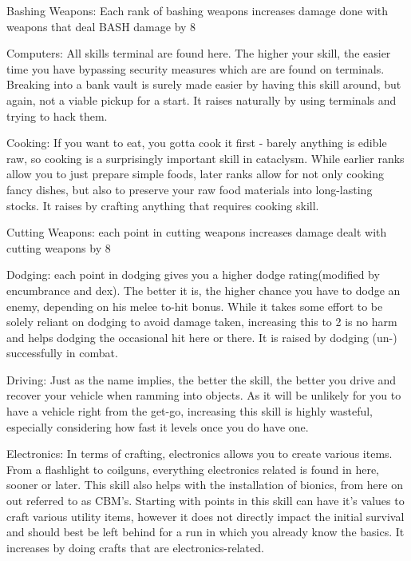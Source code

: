 \documentclass[11pt]{report}
\begin{document}
Bashing Weapons: Each rank of bashing weapons increases damage done with weapons that deal BASH damage by 8%

Computers: All skills terminal are found here. The higher your skill, the easier time you have bypassing security measures which are are found on terminals. Breaking into a bank vault is surely made easier by having this skill around, but again, not a viable pickup for a start. It raises naturally by using terminals and trying to hack them.

Cooking: If you want to eat, you gotta cook it first - barely anything is edible raw, so cooking is a surprisingly important skill in cataclysm. While earlier ranks allow you to just prepare simple foods, later ranks allow for not only cooking fancy dishes, but also to preserve your raw food materials into long-lasting stocks. It raises by crafting anything that requires cooking skill.

Cutting Weapons: each point in cutting weapons increases damage dealt with cutting weapons by 8%

Dodging: each point in dodging gives you a higher dodge rating(modified by encumbrance and dex). The better it is, the higher chance you have to dodge an enemy, depending on his melee to-hit bonus. While it takes some effort to be solely reliant on dodging to avoid damage taken, increasing this to 2 is no harm and helps dodging the occasional hit here or there. It is raised by dodging (un-) successfully in combat.

Driving: Just as the name implies, the better the skill, the better you drive and recover your vehicle when ramming into objects. As it will be unlikely for you to have a vehicle right from the get-go, increasing this skill is highly wasteful, especially considering how fast it levels once you do have one.

Electronics: In terms of crafting, electronics allows you to create various items. From a flashlight to coilguns, everything electronics related is found in here, sooner or later. This skill also helps with the installation of bionics, from here on out referred to as CBM's. Starting with points in this skill can have it's values to craft various utility items, however it does not directly impact the initial survival and should best be left behind for a run in which you already know the basics. It increases by doing crafts that are electronics-related.
\end{document}
